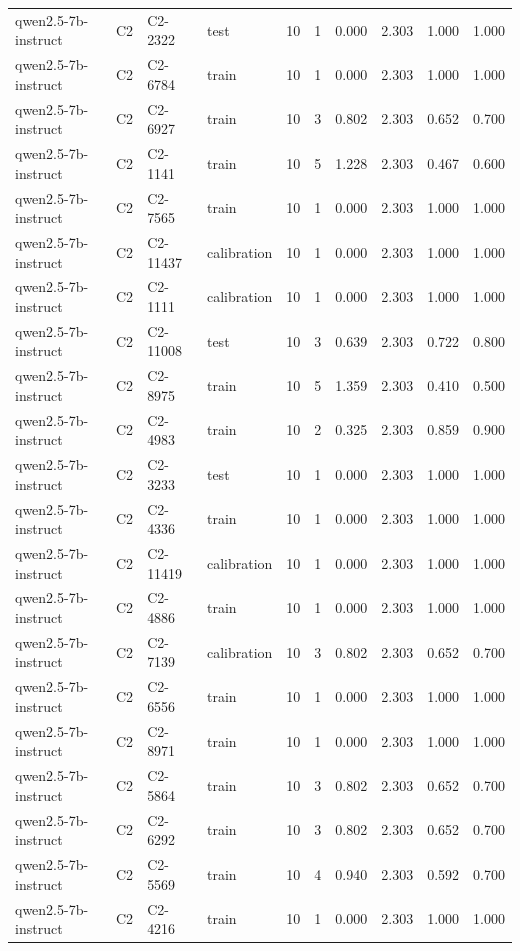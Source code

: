 \begin{table}
\begin{tabular}{llllrrrrrr}
qwen2.5-7b-instruct & C2 & C2-2322 & test & 10 & 1 & 0.000 & 2.303 & 1.000 & 1.000 \\
qwen2.5-7b-instruct & C2 & C2-6784 & train & 10 & 1 & 0.000 & 2.303 & 1.000 & 1.000 \\
qwen2.5-7b-instruct & C2 & C2-6927 & train & 10 & 3 & 0.802 & 2.303 & 0.652 & 0.700 \\
qwen2.5-7b-instruct & C2 & C2-1141 & train & 10 & 5 & 1.228 & 2.303 & 0.467 & 0.600 \\
qwen2.5-7b-instruct & C2 & C2-7565 & train & 10 & 1 & 0.000 & 2.303 & 1.000 & 1.000 \\
qwen2.5-7b-instruct & C2 & C2-11437 & calibration & 10 & 1 & 0.000 & 2.303 & 1.000 & 1.000 \\
qwen2.5-7b-instruct & C2 & C2-1111 & calibration & 10 & 1 & 0.000 & 2.303 & 1.000 & 1.000 \\
qwen2.5-7b-instruct & C2 & C2-11008 & test & 10 & 3 & 0.639 & 2.303 & 0.722 & 0.800 \\
qwen2.5-7b-instruct & C2 & C2-8975 & train & 10 & 5 & 1.359 & 2.303 & 0.410 & 0.500 \\
qwen2.5-7b-instruct & C2 & C2-4983 & train & 10 & 2 & 0.325 & 2.303 & 0.859 & 0.900 \\
qwen2.5-7b-instruct & C2 & C2-3233 & test & 10 & 1 & 0.000 & 2.303 & 1.000 & 1.000 \\
qwen2.5-7b-instruct & C2 & C2-4336 & train & 10 & 1 & 0.000 & 2.303 & 1.000 & 1.000 \\
qwen2.5-7b-instruct & C2 & C2-11419 & calibration & 10 & 1 & 0.000 & 2.303 & 1.000 & 1.000 \\
qwen2.5-7b-instruct & C2 & C2-4886 & train & 10 & 1 & 0.000 & 2.303 & 1.000 & 1.000 \\
qwen2.5-7b-instruct & C2 & C2-7139 & calibration & 10 & 3 & 0.802 & 2.303 & 0.652 & 0.700 \\
qwen2.5-7b-instruct & C2 & C2-6556 & train & 10 & 1 & 0.000 & 2.303 & 1.000 & 1.000 \\
qwen2.5-7b-instruct & C2 & C2-8971 & train & 10 & 1 & 0.000 & 2.303 & 1.000 & 1.000 \\
qwen2.5-7b-instruct & C2 & C2-5864 & train & 10 & 3 & 0.802 & 2.303 & 0.652 & 0.700 \\
qwen2.5-7b-instruct & C2 & C2-6292 & train & 10 & 3 & 0.802 & 2.303 & 0.652 & 0.700 \\
qwen2.5-7b-instruct & C2 & C2-5569 & train & 10 & 4 & 0.940 & 2.303 & 0.592 & 0.700 \\
qwen2.5-7b-instruct & C2 & C2-4216 & train & 10 & 1 & 0.000 & 2.303 & 1.000 & 1.000 \\

\end{tabular}
\end{table}
